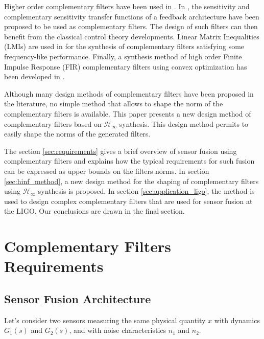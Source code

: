 \documentclass[letterpaper, 10 pt, conference]{ieeeconf}
\begin{document}
Higher order complementary filters have been used in
\cite{shaw90_bandw_enhan_posit_measur_using_measur_accel,zimmermann92_high_bandw_orien_measur_contr,collette15_sensor_fusion_method_high_perfor}.
In \cite{jensen13_basic_uas}, the sensitivity and complementary sensitivity transfer functions of a feedback architecture have been proposed to be used as complementary filters. The design of such filters can then benefit from the classical control theory developments.
Linear Matrix Inequalities (LMIs) are used in \cite{pascoal99_navig_system_desig_using_time} for the synthesis of complementary filters satisfying some frequency-like performance.
Finally, a synthesis method of high order Finite Impulse Response (FIR) complementary filters using convex optimization has been developed in \cite{hua05_low_ligo,hua04_polyp_fir_compl_filter_contr_system}. \par
Although many design methods of complementary filters have been proposed in the literature, no simple method that allows to shape the norm of the complementary filters is available.
This paper presents a new design method of complementary filters based on \(\mathcal{H}_\infty\) synthesis.
This design method permits to easily shape the norms of the generated filters.\par
The section \ref{sec:requirements} gives a brief overview of sensor fusion using complementary filters and explains how the typical requirements for such fusion can be expressed as upper bounds on the filters norms.
In section \ref{sec:hinf_method}, a new design method for the shaping of complementary filters using \(\mathcal{H}_\infty\) synthesis is proposed.
In section \ref{sec:application_ligo}, the method is used to design complex complementary filters that are used for sensor fusion at the LIGO.
Our conclusions are drawn in the final section.

\section{Complementary Filters Requirements}
\label{sec:orgcfd59fa}
\label{sec:requirements}
\subsection{Sensor Fusion Architecture}
\label{sec:orgc84edaa}
\label{sec:sensor_fusion}

Let's consider two sensors measuring the same physical quantity \(x\) with dynamics \(G_1(s)\) and \(G_2(s)\), and with noise characteristics \(n_1\) and \(n_2\).
\end{document}
